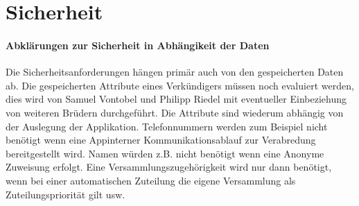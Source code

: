 
\section{Sicherheit}
\paragraph{Abklärungen zur Sicherheit in Abhängikeit der Daten} Die Sicherheitsanforderungen hängen primär auch von den gespeicherten Daten ab. Die gespeicherten Attribute eines Verkündigers müssen noch evaluiert werden, dies wird von Samuel Vontobel und Philipp Riedel mit eventueller Einbeziehung von weiteren Brüdern durchgeführt. Die Attribute sind wiederum abhängig von der Auslegung der Applikation. Telefonnummern werden zum Beispiel nicht benötigt wenn eine Appinterner Kommunikationsablauf zur Verabredung bereitgestellt wird. Namen würden z.B. nicht benötigt wenn eine Anonyme Zuweisung erfolgt. Eine Versammlungszugehörigkeit wird nur dann benötigt, wenn bei einer automatischen Zuteilung die eigene Versammlung als Zuteilungspriorität gilt usw. 

\newline

